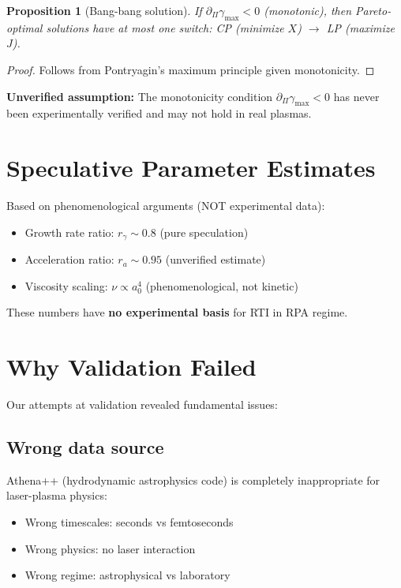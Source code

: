 \documentclass[aps,pre,twocolumn,showpacs,superscriptaddress]{revtex4-2}
\newtheorem{proposition}[theorem]{Proposition}
\begin{document}
\begin{proposition}[Bang-bang solution]
If $\partial_\Pi\gamma_{\max} < 0$ (monotonic), then Pareto-optimal solutions have at most one switch: CP (minimize $X$) $\to$ LP (maximize $J$).
\end{proposition}

\begin{proof}
Follows from Pontryagin's maximum principle given monotonicity.
\end{proof}

\textbf{Unverified assumption:} The monotonicity condition $\partial_\Pi\gamma_{\max} < 0$ has never been experimentally verified and may not hold in real plasmas.

\section{Speculative Parameter Estimates}

Based on phenomenological arguments (NOT experimental data):
\begin{itemize}
\item Growth rate ratio: $r_\gamma \sim 0.8$ (pure speculation)
\item Acceleration ratio: $r_a \sim 0.95$ (unverified estimate)
\item Viscosity scaling: $\nu \propto a_0^4$ (phenomenological, not kinetic)
\end{itemize}

These numbers have \textbf{no experimental basis} for RTI in RPA regime.

\section{Why Validation Failed}

Our attempts at validation revealed fundamental issues:

\subsection{Wrong data source}
Athena++ (hydrodynamic astrophysics code) is completely inappropriate for laser-plasma physics:
\begin{itemize}
\item Wrong timescales: seconds vs femtoseconds
\item Wrong physics: no laser interaction
\item Wrong regime: astrophysical vs laboratory
\end{itemize}
\end{document}
